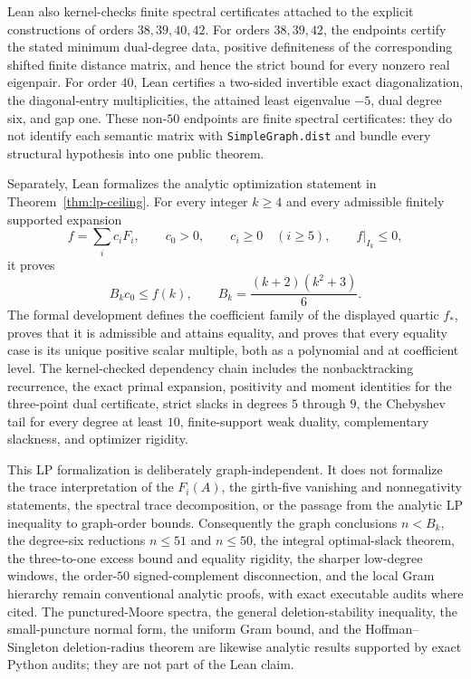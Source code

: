 \documentclass[a4paper,10pt,reqno]{amsart}
\theoremstyle{plain}
\theoremstyle{definition}
\theoremstyle{remark}
\begin{document}
Lean also kernel-checks finite spectral certificates attached to the explicit
constructions of orders \(38,39,40,42\).  For orders \(38,39,42\), the
endpoints certify the stated minimum dual-degree data, positive definiteness of
the corresponding shifted finite distance matrix, and hence the strict bound
for every nonzero real eigenpair.  For order \(40\), Lean certifies a two-sided
invertible exact diagonalization, the diagonal-entry multiplicities, the
attained least eigenvalue \(-5\), dual degree six, and gap one.  These
non-\(50\) endpoints are finite spectral certificates: they do not identify
each semantic matrix with \texttt{SimpleGraph.dist} and bundle every
structural hypothesis into one public theorem.

Separately, Lean formalizes the analytic optimization statement in
Theorem~\ref{thm:lp-ceiling}.  For every integer \(k\ge4\) and every admissible
finitely supported expansion
\[
  f=\sum_i c_iF_i,
  \qquad c_0>0,
  \qquad c_i\ge0\quad(i\ge5),
  \qquad f\vert_{I_k}\le0,
\]
it proves
\[
  B_kc_0\le f(k),
  \qquad B_k=\frac{(k+2)(k^2+3)}6.
\]
The formal development defines the coefficient family of the displayed
quartic \(f_*\), proves that it is admissible and attains equality, and proves
that every equality case is its unique positive scalar multiple, both as a
polynomial and at coefficient level.  The kernel-checked dependency chain
includes the nonbacktracking recurrence, the exact primal expansion, positivity
and moment identities for the three-point dual certificate, strict slacks in
degrees \(5\) through \(9\), the Chebyshev tail for every degree at least
\(10\), finite-support weak duality, complementary slackness, and optimizer
rigidity.

This LP formalization is deliberately graph-independent.  It does not
formalize the trace interpretation of the \(F_i(A)\), the girth-five
vanishing and nonnegativity statements, the spectral trace decomposition, or
the passage from the analytic LP inequality to graph-order bounds.
Consequently the graph conclusions \(n<B_k\), the degree-six reductions
\(n\le51\) and \(n\le50\), the integral optimal-slack theorem, the
 three-to-one excess bound and equality rigidity, the sharper low-degree
 windows, the order-\(50\) signed-complement disconnection, and the local Gram
 hierarchy remain conventional analytic proofs, with exact executable audits
 where cited.  The punctured-Moore
spectra, the general deletion-stability inequality, the small-puncture normal
form, the uniform Gram bound, and the Hoffman--Singleton deletion-radius
theorem are likewise analytic results supported by exact Python audits; they
are not part of the Lean claim.
\end{document}
